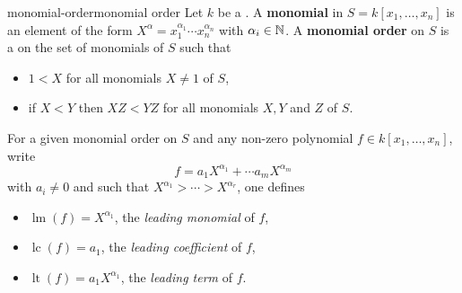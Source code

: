 \begin{topic}{monomial-order}{monomial order}
    Let $k$ be a . A \textbf{monomial} in $S = k[x_1, \ldots, x_n]$ is an element of the form $X^\alpha = x_1^{\alpha_1} \cdots x_n^{\alpha_n}$ with $\alpha_i \in \mathbb{N}$. A \textbf{monomial order} on $S$ is a  on the set of monomials of $S$ such that
    \begin{itemize}
        \item $1 < X$ for all monomials $X \ne 1$ of $S$,
        \item if $X < Y$ then $XZ < YZ$ for all monomials $X, Y$ and $Z$ of $S$.
    \end{itemize}
    
    For a given monomial order on $S$ and any non-zero polynomial $f \in k[x_1, \ldots, x_n]$, write
    \[ f = a_1 X^{\alpha_1} + \cdots a_m X^{\alpha_m} \]
    with $a_i \ne 0$ and such that $X^{\alpha_1} > \cdots > X^{\alpha_r}$, one defines
    \begin{itemize}
        \item $\operatorname{lm}(f) = X^{\alpha_1}$, the \textit{leading monomial} of $f$,
        \item $\operatorname{lc}(f) = a_1$, the \textit{leading coefficient} of $f$,
        \item $\operatorname{lt}(f) = a_1 X^{\alpha_1}$, the \textit{leading term} of $f$.
    \end{itemize}
\end{topic}

